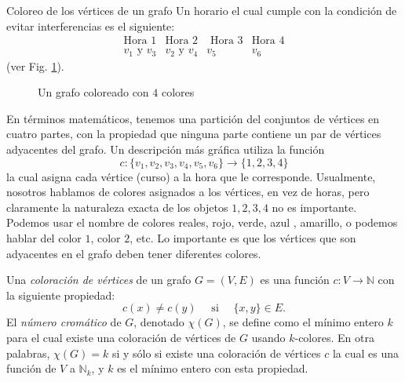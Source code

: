 \begin{section}{Coloreo de los vértices de un grafo}
Un horario el cual cumple con la condición de evitar interferencias es el siguiente:
$$
\begin{matrix}
\text{Hora 1} & \text{Hora 2} &\text{ Hora 3}& \text{Hora 4} \\
v_1 \text{ y } v_3 & v_2 \text{ y } v_4 & v_5 & v_6
\end{matrix}
$$
(ver Fig. \ref{f6.10}).
\begin{figure}[ht]
    \begin{center}
\end{center}
\caption{Un grafo coloreado con $4$ colores} \label{f6.10}
\end{figure}

En términos matemáticos, tenemos una partición del conjuntos de vértices en cuatro partes, con la propiedad que ninguna parte contiene un par de vértices adyacentes del grafo. Un descripción más gráfica utiliza la función 
$$
c: \{ v_1,v_2,v_3,v_4,v_5,v_6\} \to  \{1,2,3,4\}
$$
la cual asigna cada vértice (curso) a la hora que le corresponde. Usualmente, nosotros hablamos de colores asignados a los vértices, en vez de horas, pero claramente la naturaleza exacta de los objetos $1,2,3,4$ no es importante. Podemos usar el nombre de colores reales, rojo, verde, azul , amarillo, o podemos hablar del
color $1$, color $2$, etc. Lo importante es que los vértices que son adyacentes en el grafo deben tener diferentes colores.

\begin{definicion} Una \textit{coloración de vértices} de un   grafo $G=(V,E)$ es una función $c:V \to  \mathbb N$ con la siguiente propiedad:
$$
c(x)\not= c(y) \quad \text{ si } \quad \{x,y\} \in E.
$$
El \textit{número cromático} de $G$, denotado $\chi(G)$, se define  como el mínimo entero $k$ para el cual existe una coloración de vértices de $G$ usando $k$-colores. En otra palabras, $\chi(G)=k$ si  y sólo si existe una coloración de vértices $c$ la cual es una función de $V$ a $\mathbb N_k$, y $k$ es el mínimo entero con esta propiedad. 
\end{definicion}


\end{section}
